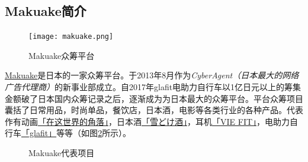 \documentclass[lang=cn,a4paper]{elegantpaper}
\begin{document}
\subsection{Makuake简介}
\begin{figure}[!htbp]
  \centering
  \texttt{[image: makuake.png]}
  \caption{Makuake众筹平台}
  \label{fig:Makuake}
\end{figure}
\href{https://www.makuake.com}{Makuake}是日本的一家众筹平台。于2013年8月作为\emph{CyberAgent（日本最大的网络广告代理商）}的新事业部成立。自2017年glafit电助力自行车以1亿日元以上的筹集金额破了日本国内众筹记录之后，逐渐成为为日本最大的众筹平台。平台众筹项目囊括了日常用品，时尚单品，餐饮店，日本酒，电影等各类行业的各种产品。代表作有动画\href{https://www.makuake.com/project/konosekai/}{「在这世界的角落」}，日本酒\href{https://www.makuake.com/project/fuyuhitoe/}{「雪どけ酒」}，耳机\href{https://www.makuake.com/project/vie-fit/}{「VIE FIT」}，电助力自行车\href{https://www.makuake.com/project/glafit/}{「glafit」}等等（如图\ref{fig:makuake project}所示）。
\begin{figure}[!htbp]
  \centering
  \captionsetup[subfigure]{labelformat=empty}
  \caption{Makuake代表项目}
  \label{fig:makuake project}
\end{figure}
\end{document}

